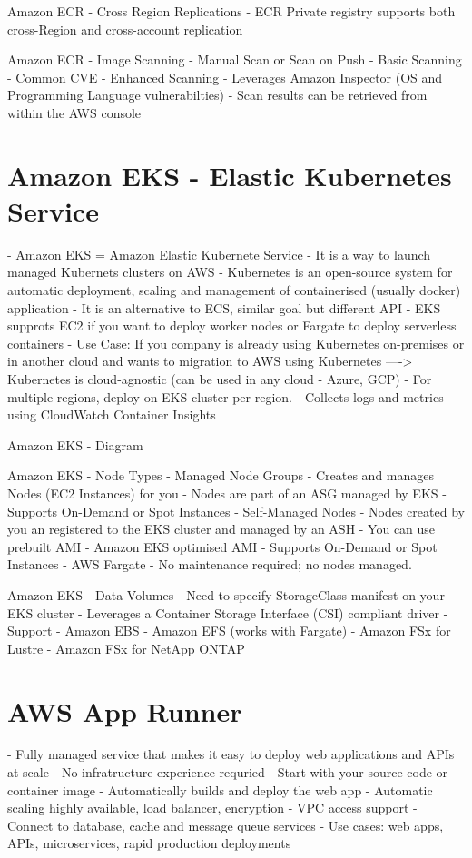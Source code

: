
Amazon ECR - Cross Region Replications
- ECR Private registry supports both cross-Region and cross-account replication

Amazon ECR - Image Scanning
- Manual Scan or Scan on Push
- Basic Scanning - Common CVE
- Enhanced Scanning - Leverages Amazon Inspector (OS and Programming Language vulnerabilties) %
- Scan results can be retrieved from within the AWS console


\section{Amazon EKS - Elastic Kubernetes Service}
- Amazon EKS = Amazon Elastic Kubernete Service
- It is a way to launch managed Kubernets clusters on AWS
- Kubernetes is an open-source system for automatic deployment, scaling and management of containerised (usually docker) application
- It is an alternative to ECS, similar goal but different API
- EKS supprots EC2 if you want to deploy worker nodes or Fargate to deploy serverless containers
- Use Case: If you company is already using Kubernetes on-premises or in another cloud and wants to migration to AWS using Kubernetes
----> Kubernetes is cloud-agnostic (can be used in any cloud - Azure, GCP)
- For multiple regions, deploy on EKS cluster per region.
- Collects logs and metrics using CloudWatch Container Insights

Amazon EKS - Diagram

Amazon EKS - Node Types
- Managed Node Groups
- Creates and manages Nodes (EC2 Instances) for you
- Nodes are part of an ASG managed by EKS
- Supports On-Demand or Spot Instances
- Self-Managed Nodes
- Nodes created by you an registered to the EKS cluster and managed by an ASH
- You can use prebuilt AMI - Amazon EKS optimised AMI
- Supports On-Demand or Spot Instances
- AWS Fargate
- No maintenance required; no nodes managed.

Amazon EKS - Data Volumes
- Need to specify StorageClass manifest on your EKS cluster
- Leverages a Container Storage Interface (CSI) compliant driver
- Support
- Amazon EBS
- Amazon EFS (works with Fargate)
- Amazon FSx for Lustre
- Amazon FSx for NetApp ONTAP


\section{AWS App Runner}
- Fully managed service that makes it easy to deploy web applications and APIs at scale
- No infratructure experience requried
- Start with your source code or container image
- Automatically builds and deploy the web app
- Automatic scaling highly available, load balancer, encryption
- VPC access support
- Connect to database, cache and message queue services
- Use cases: web apps, APIs, microservices, rapid production deployments

